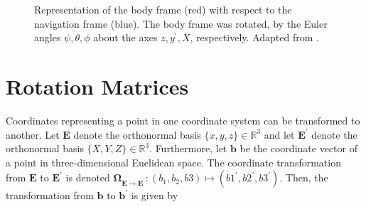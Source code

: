 \begin{figure}[ht]
\centering
{}
\caption{Representation of the body frame (red) with respect to the navigation frame (blue). The body frame was rotated, by the Euler angles $\psi, \theta, \phi$ about the axes $z, y^{'}, X$, respectively. Adapted from \cite{Wiki_taitbryan}.} \label{fig:Euler_angles}
\end{figure}

\section{Rotation Matrices}

Coordinates representing a point in one coordinate system can be transformed to another. Let $\mathbf{E}$ denote the orthonormal basis $\{x, y, z\} \in \mathbb{R}^3$ and let $\mathbf{E}^{'}$ denote the orthonormal basis $\{X, Y, Z\} \in \mathbb{R}^3$. Furthermore, let $\mathbf{b}$ be the coordinate vector of a point in three-dimensional Euclidean space. The coordinate transformation from $\mathbf{E}$ to $\mathbf{E}^{'}$ is denoted $\mathbf{\Omega}_{\mathbf{E} \rightarrow \mathbf{E}^{'}}: (b_1, b_2, b3) \mapsto (b1^{'}, b2^{'}, b3^{'})$. Then, the transformation from $\mathbf{b}$ to $\mathbf{b}^{'}$ is given by

